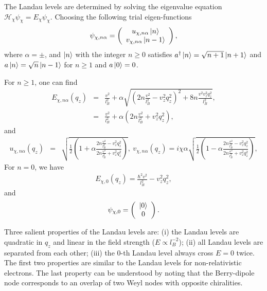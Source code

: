 \documentclass[aps,prl,twocolumn,longbibliography]{revtex4-1}
\begin{document}
\begin{widetext}
The Landau levels are determined by solving the eigenvalue equation $\mathcal{H}_{\chi}\psi_{\chi}=E_{\chi}\psi_{\chi}$. Choosing
the following trial eigen-functions
\begin{eqnarray}
	\psi_{\chi,n\alpha}=\left(\begin{array}{c}
		u_{\chi,n\alpha}\ket{n}\\
		v_{\chi,n\alpha}\ket{n-1}\\
	\end{array}\right),
\end{eqnarray}
where $\alpha=\pm$, and $\ket{n}$ with the integer $n\geq0$ satisfies $a^{\dag}\ket{n}=\sqrt{n+1}\ket{n+1}$ and $a\ket{n}=\sqrt{n}\ket{n-1}$ for $n\geq1$ and $a\ket{0}=0$.


For $n\geq1$, one can find
\begin{eqnarray} E_{\chi,n\alpha}(q_{z})&=&\frac{v^{2}}{l_{B}^{2}}+\alpha\sqrt{\left(2n\frac{v^{2}}{l_{B}^{2}}-v_{z}^{2}q_{z}^{2}\right)^{2}
+8n\frac{v^{2}v_{z}^{2}q_{z}^{2}}{l_{B}^{2}}},\nonumber\\
	&=&\frac{v^{2}}{l_{B}^{2}}+\alpha(2n\frac{v^{2}}{l_{B}^{2}}+v_{z}^{2}q_{z}^{2}),
	\label{eq: E_Bz_ngeq0}
\end{eqnarray}
and
\begin{eqnarray}	u_{\chi,n\alpha}(q_{z})&=&\sqrt{\frac{1}{2}\left(1+\alpha\frac{2n\frac{v^{2}}{l_{B}^{2}}-v_{z}^{2}q_{z}^{2}}{2n\frac{v^{2}}{l_{B}^{2}}+v_{z}^{2}q_{z}^{2}}\right)},\
	v_{\chi,n\alpha}(q_{z})=i\chi \alpha \sqrt{\frac{1}{2}\left(1-\alpha\frac{2n\frac{v^{2}}{l_{B}^{2}}-v_{z}^{2}q_{z}^{2}}{2n\frac{v^{2}}{l_{B}^{2}}+v_{z}^{2}q_{z}^{2}}\right)},
\end{eqnarray}
For $n=0$, we have
\begin{eqnarray}
	E_{\chi,0}(q_{z})=\frac{\hbar^{2}v^{2}}{l_{B}^{2}}-v_{z}^{2}q_{z}^{2},
	\label{eq: E_Bz_n0}
\end{eqnarray}
and
\begin{eqnarray}
	\psi_{\chi,0}=\left(\begin{array}{c}
		\ket{0}\\
		0\\
	\end{array}\right).
\end{eqnarray}

Three salient properties of the Landau levels are: (i) the Landau levels are quadratic in $q_{z}$ and linear in the field strength
($E\propto l_{B}^{-2}$);
(ii) all Landau levels are separated from each other; (iii) the $0$-th Landau level always cross $E=0$ twice.
The first two properties are similar to the Landau levels for non-relativistic electrons.   The last property
can be understood by noting that the Berry-dipole node corresponds to an overlap of two Weyl nodes with opposite chiralities.


\end{widetext}
\end{document}
